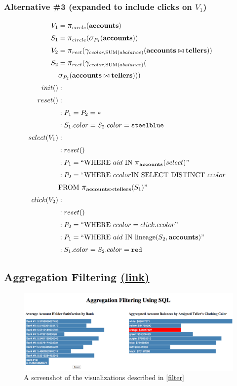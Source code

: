 \documentclass[fleqn,reprint]{sigplanconf}
\begin{document}
\subsubsection{Alternative \#3 (expanded to include clicks on $V_1$)}
\begin{align*}
	V_1&= \mathlarger{\pi}_{circle}(\bf{accounts})\\
	S_1&= \mathlarger{\pi}_{circle}(\mathlarger{\sigma}_{P_1}(\bf{accounts}))\\
	V_2&= \mathlarger{\pi}_{rect}(\mathlarger{\gamma}_{ccolor, \text{SUM}(abalance)}(\bf{accounts}\bowtie{}\bf{tellers}))\\
	S_2&= \mathlarger{\pi}_{rect}(\mathlarger{\gamma}_{ccolor, \text{SUM}(abalance)}(\\&\mathlarger{\sigma}_{P_2}(\bf{accounts}\bowtie{}\bf{tellers})))\\
	init()&:\\
	reset()&:\\
	&: P_1 = P_2 = *\\
	&: S_1.color = S_2.color = \texttt{steelblue}\\
	select(V_1)&:\\
	&: reset()\\
	&: P_1 = ``\text{WHERE}~aid~\text{IN}~\mathlarger{\pi}_{\bf{accounts}}(select)"\\
	&: P_2 = ``\text{WHERE}~ccolor\text{IN~SELECT~DISTINCT}~ccolor~\\&\text{FROM}~\mathlarger{\pi}_{\bf{accounts}\bowtie{}\bf{tellers}}(S_1)"\\
	click(V_2)&:\\
	&: reset()\\
	&: P_2 = ``\text{WHERE}~ccolor=click.ccolor"\\
	&: P_1 = ``\text{WHERE}~aid~\text{IN~lineage}(S_2, \bf{accounts})"\\
	&: S_1.color = S_2.color = \texttt{red}\\
\end{align*}
\subsection{Aggregation Filtering \href{http://randy.cs.columbia.edu/lineage/pgbench-filter/pgbench.html}{(\underline{link})}}\label{filter}
\begin{figure}[H]
	\includegraphics[width=\columnwidth]{figures/filter}
	\caption{A screenshot of the visualizations described in \autoref{filter}
	}
	\label{fig_filter}
\end{figure}
\end{document}
